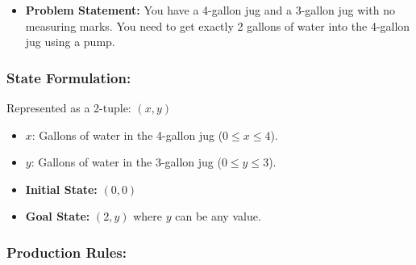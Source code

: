 \begin{itemize}
  \item   \textbf{Problem Statement:} You have a 4-gallon jug and a 3-gallon jug with no measuring marks. You need to get exactly 2 gallons of water into the 4-gallon jug using a pump.
\end{itemize}

\subsubsection{State Formulation:}
Represented as a 2-tuple: $(x, y)$
\begin{itemize}
  \item   $x$: Gallons of water in the 4-gallon jug ($0 \le x \le 4$).
  \item   $y$: Gallons of water in the 3-gallon jug ($0 \le y \le 3$).
  \item   \textbf{Initial State:} $(0, 0)$
  \item   \textbf{Goal State:} $(2, y)$ where $y$ can be any value.
\end{itemize}

\subsubsection{Production Rules:}

